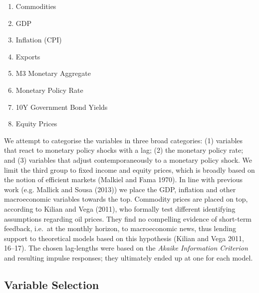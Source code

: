 \documentclass[12pt,]{article}
\providecommand{\tightlist}{%
  \setlength{\itemsep}{0pt}\setlength{\parskip}{0pt}}
\begin{document}
\begin{enumerate}
\def\labelenumi{\arabic{enumi}.}
\tightlist
\item
  Commodities
\item
  GDP
\item
  Inflation (CPI)
\item
  Exports
\item
  M3 Monetary Aggregate
\item
  Monetary Policy Rate
\item
  10Y Government Bond Yields
\item
  Equity Prices
\end{enumerate}

We attempt to categorise the variables in three broad categories: (1)
variables that react to monetary policy shocks with a lag; (2) the
monetary policy rate; and (3) variables that adjust contemporaneously to
a monetary policy shock. We limit the third group to fixed income and
equity prices, which is broadly based on the notion of efficient markets
(Malkiel and Fama 1970). In line with previous work (e.g. Mallick and
Sousa (2013)) we place the GDP, inflation and other macroeconomic
variables towards the top. Commodity prices are placed on top, according
to Kilian and Vega (2011), who formally test different identifying
assumptions regarding oil prices. They find no compelling evidence of
short-term feedback, i.e.~at the monthly horizon, to macroeconomic news,
thus lending support to theoretical models based on this hypothesis
(Kilian and Vega 2011, 16--17). The chosen lag-lengths were based on the
\emph{Akaike Information Criterion} and resulting impulse responses;
they ultimately ended up at one for each model.

\subsection{Variable Selection}\label{variable-selection}
\end{document}
